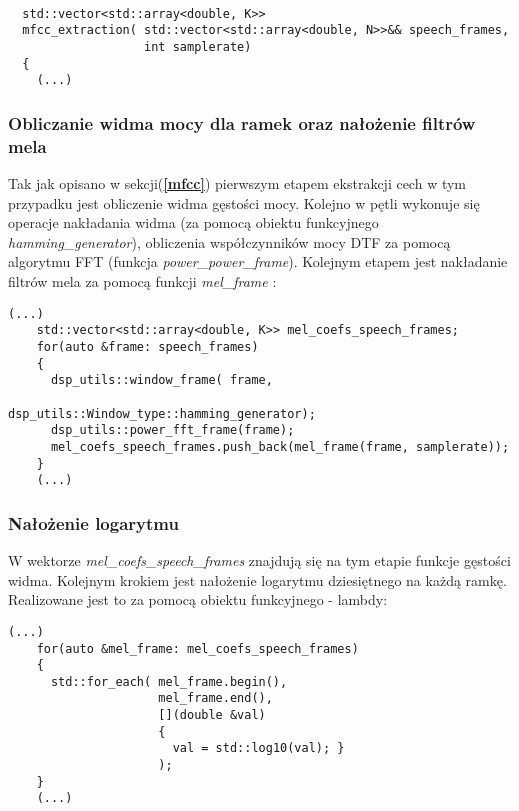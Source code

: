 \begin{lstlisting}[style=lst:cpp, caption=Implementacja funkcji mfcc\_extraction\label{lst:mfcc}]

  std::vector<std::array<double, K>>
  mfcc_extraction( std::vector<std::array<double, N>>&& speech_frames,
                   int samplerate)
  {
    (...)
\end{lstlisting}

    \subsubsection{Obliczanie widma mocy dla ramek oraz nałożenie filtrów mela}

Tak jak opisano w sekcji(\textbf{\ref{mfcc}}) pierwszym etapem ekstrakcji cech w tym przypadku jest obliczenie widma gęstości mocy. Kolejno w pętli wykonuje się operacje nakładania widma (za pomocą obiektu funkcyjnego \textit{hamming\_generator}), obliczenia współczynników mocy DTF za pomocą algorytmu FFT (funkcja \textit{power\_power\_frame}). Kolejnym etapem jest nakładanie filtrów mela za pomocą funkcji \textit{mel\_frame} : 

\begin{lstlisting}[style=lst:cpp, caption=funkcja \textit{mfcc\_extraction} - obliczanie widma gęstości mocy\label{lst:mfccpower}]
    (...)
    std::vector<std::array<double, K>> mel_coefs_speech_frames;
    for(auto &frame: speech_frames)
    {
      dsp_utils::window_frame( frame,
                               dsp_utils::Window_type::hamming_generator);
      dsp_utils::power_fft_frame(frame);
      mel_coefs_speech_frames.push_back(mel_frame(frame, samplerate));
    }
    (...)
\end{lstlisting}

\subsubsection{Nałożenie logarytmu}

W wektorze \textit{mel\_coefs\_speech\_frames} znajdują się na tym etapie funkcje gęstości widma. Kolejnym krokiem jest nałożenie logarytmu dziesiętnego na każdą ramkę. Realizowane jest to za pomocą obiektu funkcyjnego - lambdy: 

\begin{lstlisting}[style=lst:cpp, caption=funkcja \textit{mfcc\_extraction} - obliczanie logarytmu widma gęstości mocy \label{lst:mfcclog}]
    (...)
    for(auto &mel_frame: mel_coefs_speech_frames)
    {
      std::for_each( mel_frame.begin(),
                     mel_frame.end(),
                     [](double &val)
                     {
                       val = std::log10(val); }
                     );
    } 
    (...)
\end{lstlisting}


